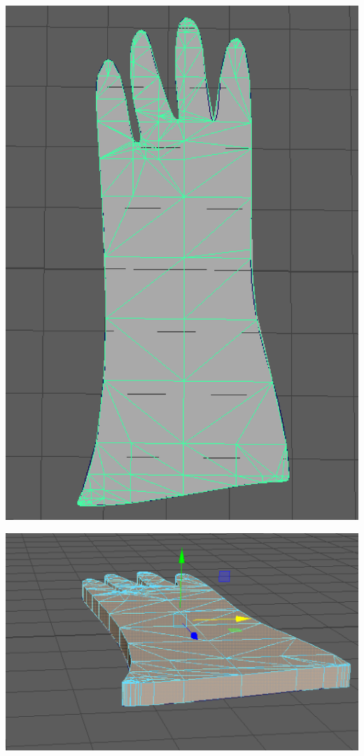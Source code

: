 \documentclass[ %
                    author={Elis Jones},
                supervisor={Dr. Kirsten Cater},
                    degree={BSc},
                     title={The Effect of Presentation Medium on Spatial Cognition},
                  subtitle={in the Virtual Environment},
                      year={2018} ]{dissertation}
\begin{document}
\begin{minipage}{\textwidth}
\begin{center}
\begin{minipage}{0.18\textwidth}
        \includegraphics[width=1\textwidth]{images/topoly.png}
    \end{minipage}\hfill
        \centering
    \begin{minipage}{0.18\textwidth}
        \centering
        \includegraphics[width=1\textwidth]{images/extrude.png}

\end{minipage}
\end{center}
\end{minipage}
\end{document}

